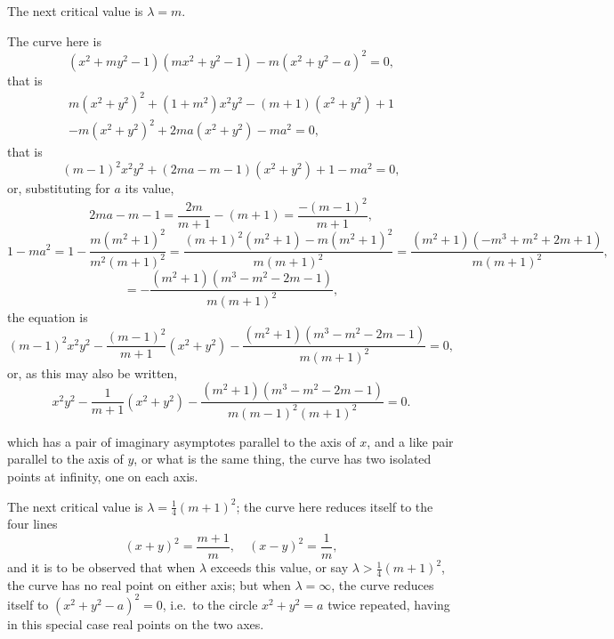 \documentclass[11pt,a4paper]{article}
\theoremstyle{plain}
\begin{document}
The next critical value is $\lambda = m$.

The curve here is
\begin{equation}
(x^2 + my^2 - 1)(mx^2 + y^2 - 1) - m(x^2 + y^2 - a)^2 = 0,
\end{equation}
that is
\begin{multline}
m(x^2+y^2)^2 + (1+m^2)x^2y^2 - (m+1)(x^2+y^2) + 1 \\
- m(x^2+y^2)^2 + 2ma(x^2+y^2) - ma^2 = 0,
\end{multline}
that is
\begin{equation}
(m-1)^2 x^2y^2 + (2ma - m - 1)(x^2 + y^2) + 1 - ma^2 = 0,
\end{equation}
or, substituting for $a$ its value,
\begin{equation}
2ma - m - 1 = \frac{2m}{m+1} - (m+1) = \frac{-(m-1)^2}{m+1},
\end{equation}
\begin{equation}
1-ma^2 = 1 - \frac{m(m^2+1)^2}{m^2(m+1)^2} = \frac{(m+1)^2(m^2+1) - m(m^2+1)^2}{m(m+1)^2} = \frac{(m^2+1)(-m^3+m^2+2m+1)}{m(m+1)^2},
\end{equation}
\begin{equation}
= -\frac{(m^2+1)(m^3-m^2-2m-1)}{m(m+1)^2},
\end{equation}
the equation is
\begin{equation}
(m-1)^2 x^2y^2 - \frac{(m-1)^2}{m+1}(x^2+y^2) - \frac{(m^2+1)(m^3-m^2-2m-1)}{m(m+1)^2} = 0,
\end{equation}
or, as this may also be written,
\begin{equation}
x^2y^2 - \frac{1}{m+1}(x^2+y^2) - \frac{(m^2+1)(m^3-m^2-2m-1)}{m(m-1)^2(m+1)^2} = 0.
\end{equation}

\newpage
\setcounter{equation}{20}

which has a pair of imaginary asymptotes parallel to the axis of $x$, and a like pair parallel to the axis of $y$, or what is the same thing, the curve has two isolated points at infinity, one on each axis.

The next critical value is $\lambda = \tfrac{1}{4}(m+1)^2$; the curve here reduces itself to the four lines
\begin{equation}
(x+y)^2 = \frac{m+1}{m}, \quad (x-y)^2 = \frac{1}{m},
\end{equation}
and it is to be observed that when $\lambda$ exceeds this value, or say $\lambda > \tfrac{1}{4}(m+1)^2$, the curve has no real point on either axis; but when $\lambda = \infty$, the curve reduces itself to $(x^2 + y^2 - a)^2 = 0$, i.e.~to the circle $x^2 + y^2 = a$ twice repeated, having in this special case real points on the two axes.
\end{document}
